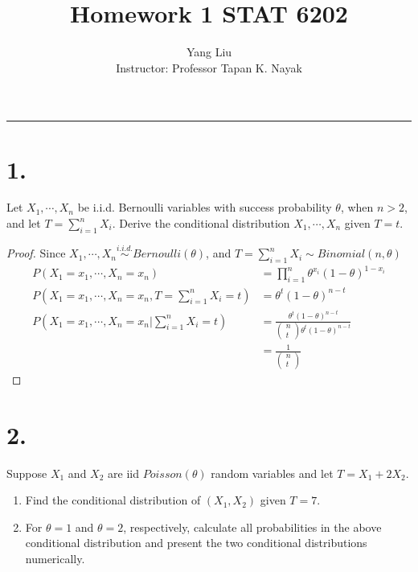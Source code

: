 \documentclass[a4paper, 11pt]{article}
\begin{document}
	\title{Homework 1  STAT 6202}%
	\author{Yang Liu\\ %
		Instructor: Professor Tapan K. Nayak  } %
	\maketitle
		\hrule
	
	\section*{1.} Let $X_1,\cdots,X_n$ be i.i.d. Bernoulli variables with success probability $\theta$, when $n>2$, and let $T=\sum_{i=1}^{n}X_i$. Derive the conditional distribution $X_1,\cdots,X_n$ given $T=t$.
	\begin{proof}
		Since $X_1,\cdots,X_n\stackrel{i.i.d.}{\sim}Bernoulli(\theta)$, and $T=\sum_{i=1}^nX_i\sim Binomial (n,\theta)$
  \begin{align*}
  P\left(X_1=x_1,\cdots,X_n=x_n\right)& =\prod_{i=1}^{n}\theta^{x_i}(1-\theta)^{1-x_i} \\
  	P\left(X_1=x_1,\cdots,X_n=x_n, T=\sum_{i=1}^nX_i=t\right)& =\theta^t(1-\theta)^{n-t}\\
  	P\left(\left.X_{1}=x_{1},\cdots,X_{n}=x_{n}\right|\sum_{i=1}^{n}X_{i}=t\right)& =\frac{\theta^t(1-\theta)^{n-t}}{\left(\begin{array}{c}
  		n\\
  		t
  		\end{array}\right)\theta^{t}\left(1-\theta\right)^{n-t}}\\
  	& = \frac{1}{\left(\begin{array}{c}
  		n\\
  		t
  		\end{array}\right)}
  \end{align*}
  	\end{proof}
  
  \section*{2.}  Suppose $X_1$ and $X_2$ are iid $Poisson(\theta)$ random variables and let $T = X_1 + 2X_2$.
\begin{enumerate}[label=(\alph*)]
\item   Find the conditional distribution of $(X_1, X_2)$ given $T = 7$.
\item  For $\theta = 1$ and $\theta = 2$, respectively, calculate all probabilities in the above conditional
distribution and present the two conditional distributions numerically.
\end{enumerate}
\end{document}
